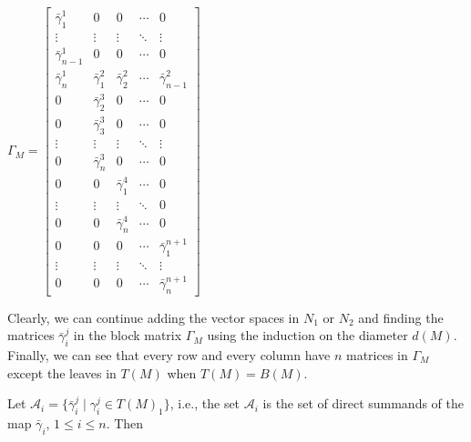 \documentclass[a4paper,12pt]{amsart}
\newcommand{\cA}{\mathcal{A}}
\newcommand{\bg}{\bar{\gamma}}
\begin{document}
\begin{center}
$\Gamma_M=\begin{bmatrix}
\bar{\gamma}^1_{1} & 0 & 0 &  \cdots & 0\\
\vdots &  \vdots & \vdots & \ddots & \vdots\\
\bar{\gamma}^1_{n-1} & 0 & 0&  \cdots & 0\\
\bar{\gamma}^1_{n} & \bar{\gamma}^2_{1} & \bg^2_2&  \cdots & \bar{\gamma}^2_{n-1}\\
0 & \bg^3_2 & 0&  \cdots & 0\\
0 & \bg^3_3 & 0&  \cdots & 0 \\
\vdots & \vdots &  \vdots& \ddots & \vdots \\
0 & \bg^3_n & 0 & \cdots & 0 \\
0 & 0& \bg^4_1 & \cdots & 0\\
\vdots & \vdots& \vdots & \ddots & 0\\
0 & 0 & \bg^4_n & \cdots & 0\\
0& 0 &  0 & \cdots & \bg^{n+1}_1\\
\vdots&  \vdots & \vdots & \ddots& \vdots\\
0& 0&  0& \cdots& \bg^{n+1}_{n}

\end{bmatrix}$
\end{center}
Clearly, we can continue adding the vector spaces in $N_1$ or $N_2$ and  finding the matrices $\bg^j_i$ in the block matrix $\Gamma_M$ using the induction on the diameter $d(M)$. Finally, we can see that every row and every column have $n$ matrices in $\Gamma_M$ except the leaves in $T(M)$ when $T(M)=B(M)$.  


Let   $\cA_i=\{\bg^j_i\mid \gamma^j_i\in T(M)_1 \}$, i.e., the set $\cA_i$ is the set of direct summands of the map $\bg_i$, $1\leq i\leq n$. Then 
\end{document}
